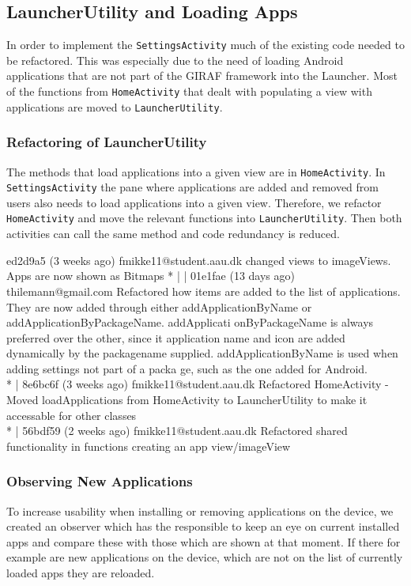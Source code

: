 \subsection{LauncherUtility and Loading Apps}\label{sect:sprint3:refactoring}
In order to implement the \lstinline!SettingsActivity! much of the existing code needed to be refactored.
This was especially due to the need of loading Android applications that are not part of the GIRAF framework  into the Launcher. 
Most of the functions from \lstinline|HomeActivity| that dealt with populating a view with applications are moved to \lstinline|LauncherUtility|.

\subsubsection{Refactoring of LauncherUtility}
The methods that load applications into a given view are in \lstinline!HomeActivity!.
In \lstinline!SettingsActivity! the pane where applications are added and removed from users also needs to load applications into a given view.
Therefore, we refactor \lstinline!HomeActivity! and move the relevant functions into \lstinline!LauncherUtility!.
Then both activities can call the same method and code redundancy is reduced. 

 ed2d9a5 (3 weeks ago) fmikke11@student.aau.dk changed views to imageViews. Apps are now shown as Bitmaps
* | | 01e1fae (13 days ago) thilemann@gmail.com Refactored how items are added to the list of applications. They are now added through either addApplicationByName or addApplicationByPackageName. addApplicati
onByPackageName is always preferred over the other, since it application name and icon are added dynamically by the packagename supplied. addApplicationByName is used when adding settings not part of a packa
ge, such as the one added for Android.\\
* | 8e6bc6f (3 weeks ago) fmikke11@student.aau.dk Refactored HomeActivity - Moved loadApplications from HomeActivity to LauncherUtility to make it accessable for other classes\\
* | 56bdf59 (2 weeks ago) fmikke11@student.aau.dk Refactored shared functionality in functions creating an app view/imageView\\

\subsubsection{Observing New Applications}\label{sec:sprint3:observing}
To increase usability when installing or removing applications on the device, we created an observer which has the responsible to keep an eye on current installed apps and compare these with those which are shown at that moment. If there for example are new applications on the device, which are not on the list of currently loaded apps they are reloaded.

